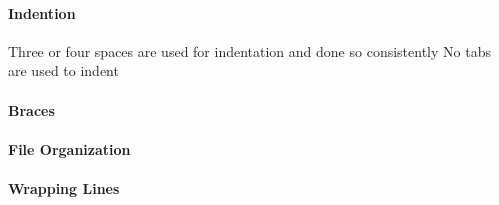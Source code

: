 \paragraph{Indention}
\begin{itemize}
	Three or four spaces are used for indentation and done so consistently
	No tabs are used to indent
\end{itemize}

\paragraph{Braces}
\begin{itemize}
\end{itemize}

\paragraph{File Organization}
\begin{itemize}
\end{itemize}

\paragraph{Wrapping Lines}
\begin{itemize}
\end{itemize}

